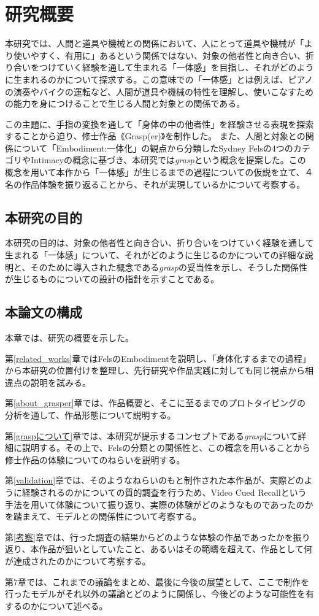 \chapter{研究概要}
\label{introduction}
本研究では、人間と道具や機械との関係において、人にとって道具や機械が「より使いやすく、有用に」あるという関係ではない、対象の他者性と向き合い、折り合いをつけていく経験を通して生まれる「一体感」を目指し、それがどのように生まれるのかについて探求する。この意味での「一体感」とは例えば、ピアノの演奏やバイクの運転など、人間が道具や機械の特性を理解し、使いこなすための能力を身につけることで生じる人間と対象との関係である。

この主題に、手指の変換を通して「身体の中の他者性」を経験させる表現を探索することから迫り、修士作品《Grasp(er)》を制作した。
また、人間と対象との関係について「Embodiment:一体化」の観点から分類したSydney Felsの4つのカテゴリやIntimacyの概念に基づき、本研究では\textit{grasp}という概念を提案した。この概念を用いて本作から「一体感」が生じるまでの過程についての仮説を立て、４名の作品体験を振り返ることから、それが実現しているかについて考察する。

\section{本研究の目的}
本研究の目的は、対象の他者性と向き合い、折り合いをつけていく経験を通して生まれる「一体感」について、それがどのように生じるのかについての詳細な説明と、そのために導入された概念である\textit{grasp}の妥当性を示し、そうした関係性が生じるものについての設計の指針を示すことである。

\section{本論文の構成}
本章では、研究の概要を示した。

第\ref{related_works}章ではFelsのEmbodimentを説明し、「身体化するまでの過程」から本研究の位置付けを整理し、先行研究や作品実践に対しても同じ視点から相違点の説明を試みる。

第\ref{about_grasper}章では、作品概要と、そこに至るまでのプロトタイピングの分析を通して、作品形態について説明する。

第\ref{graspについて}章では、本研究が提示するコンセプトである\textit{grasp}について詳細に説明する。その上で、Felsの分類との関係性と、この概念を用いることから修士作品の体験についてのねらいを説明する。

第\ref{validation}章では、そのようなねらいのもと制作された本作品が、実際どのように経験されるのかについての質的調査を行うため、Video Cued Recallという手法を用いて体験について振り返り、実際の体験がどのようなものであったのかを踏まえて、モデルとの関係性について考察する。

第\ref{考察}章では、行った調査の結果からどのような体験の作品であったかを振り返り、本作品が狙いとしていたこと、あるいはその範疇を超えて、作品として何が達成されたのかについて考察する。

第7章では、これまでの議論をまとめ、最後に今後の展望として、ここで制作を行ったモデルがそれ以外の議論とどのように関係し、今後どのような可能性を有するのかについて述べる。